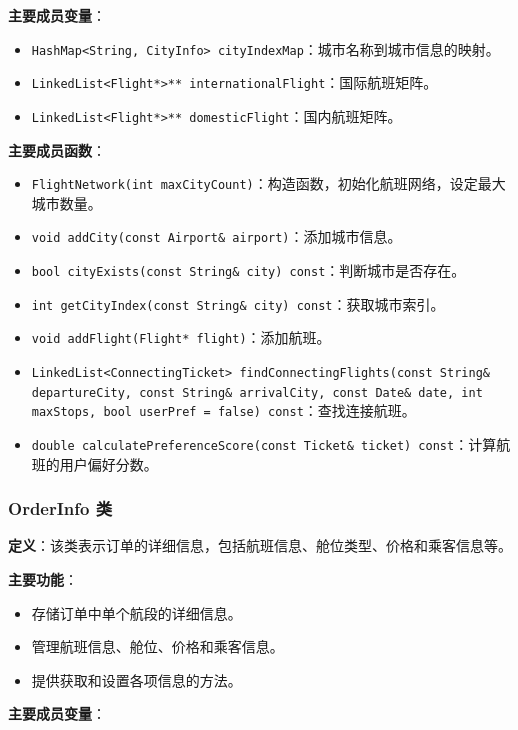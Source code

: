 \documentclass[UTF8, a4paper,12pt]{ctexart}
\begin{document}
\textbf{主要成员变量}：

\begin{itemize}
    \item \texttt{HashMap<String, CityInfo> cityIndexMap}：城市名称到城市信息的映射。
    \item \texttt{LinkedList<Flight*>** internationalFlight}：国际航班矩阵。
    \item \texttt{LinkedList<Flight*>** domesticFlight}：国内航班矩阵。
\end{itemize}

\textbf{主要成员函数}：

\begin{itemize}
    \item \texttt{FlightNetwork(int maxCityCount)}：构造函数，初始化航班网络，设定最大城市数量。
    \item \texttt{void addCity(const Airport\& airport)}：添加城市信息。
    \item \texttt{bool cityExists(const String\& city) const}：判断城市是否存在。
    \item \texttt{int getCityIndex(const String\& city) const}：获取城市索引。
    \item \texttt{void addFlight(Flight* flight)}：添加航班。
    \item \texttt{LinkedList<ConnectingTicket> findConnectingFlights(const String\& departureCity, const String\& arrivalCity, const Date\& date, int maxStops, bool userPref = false) const}：查找连接航班。
    \item \texttt{double calculatePreferenceScore(const Ticket\& ticket) const}：计算航班的用户偏好分数。
\end{itemize}

\subsubsection{OrderInfo 类}

\textbf{定义}：该类表示订单的详细信息，包括航班信息、舱位类型、价格和乘客信息等。

\textbf{主要功能}：

\begin{itemize}
    \item 存储订单中单个航段的详细信息。
    \item 管理航班信息、舱位、价格和乘客信息。
    \item 提供获取和设置各项信息的方法。
\end{itemize}

\textbf{主要成员变量}：
\end{document}

